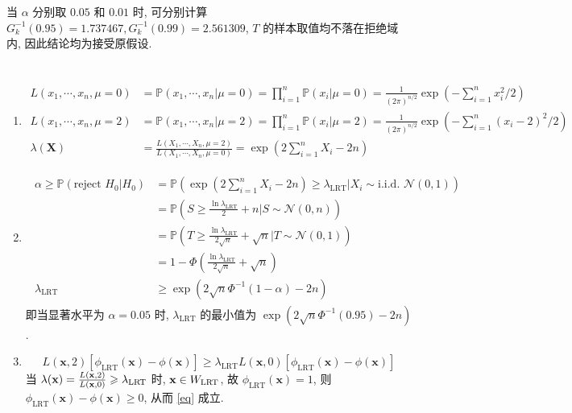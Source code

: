 \documentclass[8pt]{article}
\theoremstyle{compact}
\def\ge{\geqslant}
\def\P#1{\mathbb{P}\left({#1}\right)}
\begin{document}
当 $\alpha$ 分别取 $0.05$ 和 $0.01$ 时, 可分别计算 $G_k^{-1}(0.95) = 1.737467, G_k^{-1}(0.99) = 2.561309$, $T$ 的样本取值均不落在拒绝域内, 因此结论均为接受原假设.

\section{}
\def\LRT{\text{LRT}}
\begin{enumerate}
	\item \begin{align*}
		L(x_1, \cdots, x_n, \mu = 0) &= \P{x_1, \cdots, x_n | \mu = 0} = \prod_{i=1}^{n}\P{x_i | \mu = 0} = \frac{1}{(2\pi)^{n/2}}\exp\left(-\sum_{i=1}^{n}x_i^2 / 2\right) \\
		L(x_1, \cdots, x_n, \mu = 2) &= \P{x_1, \cdots, x_n | \mu = 2} = \prod_{i=1}^{n}\P{x_i | \mu = 2} = \frac{1}{(2\pi)^{n/2}}\exp\left(-\sum_{i=1}^{n}(x_i - 2)^2 / 2\right) \\
		\lambda(\mathbf X) &= \frac{L(X_1, \cdots, X_n, \mu = 2)}{L(X_1, \cdots, X_n, \mu = 0)} = \exp\left(2\sum_{i=1}^{n}X_i - 2n\right)
	\end{align*}
	\item  \begin{align*}
		\begin{split}
			\alpha \ge \P{\text{reject }H_0 | H_0} &= \P{\exp\left(2\sum_{i=1}^{n}X_i - 2n\right) \ge \lambda_{\LRT} \bigg| X_i \sim \text{i.i.d. }\mathcal N(0, 1)} \\
			&= \P{S \ge \frac{\ln \lambda_{\LRT}}{2} + n \bigg| S \sim \mathcal N(0, n)} \\
			&= \P{T \ge \frac{\ln \lambda_{\LRT}}{2\sqrt n} + \sqrt n \bigg| T \sim \mathcal N(0, 1)} \\
			&= 1 - \Phi\left(\frac{\ln \lambda_{\LRT}}{2\sqrt n} + \sqrt n\right) \\ \lambda_{\LRT} &\ge \exp\left(2\sqrt n\Phi^{-1}(1 - \alpha) - 2n\right)
		\end{split}
	\end{align*}
	即当显著水平为 $\alpha = 0.05$ 时, $\lambda_{\LRT}$ 的最小值为 $\exp\left(2\sqrt n\Phi^{-1}(0.95) - 2n\right)$.
	\item \begin{equation}
		L(\mathbf x, 2)[\phi_{\LRT}(\mathbf x) - \phi(\mathbf x)] \ge \lambda_{\LRT}L(\mathbf x, 0)[\phi_{\LRT}(\mathbf x) - \phi(\mathbf x)]
		\label{eq}
	\end{equation}
	当 $\lambda(\textbf x) = \frac{L(\mathbf x, 2)}{L(\mathbf x, 0)} \ge \lambda_{\LRT}$ 时, $\textbf x \in W_{\LRT}$, 故 $\phi_{\LRT}(\mathbf x) = 1$, 则 $\phi_{\LRT}(\mathbf x) - \phi(\mathbf x) \ge 0$, 从而 \cref{eq} 成立.
	

\end{enumerate}
\end{document}
